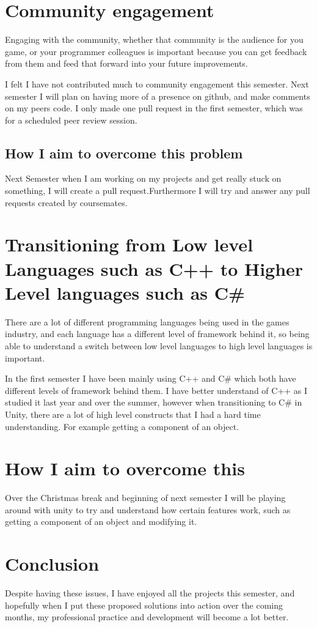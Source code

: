 \documentclass{scrartcl}
\begin{document}
\section{Community engagement}
Engaging with the community, whether that community is the audience for you game, or your programmer colleagues is important because you can get feedback from them and feed that forward into your future improvements.


I felt I have not contributed much to community engagement this semester.
Next semester I will plan on having more of a presence on github, and make comments on my peers code.
I only made one pull request in the first semester, which was for a scheduled peer review session.

\subsection{How I aim to overcome this problem}
Next Semester when I am working on my projects and get really stuck on something, I will create a pull request.Furthermore I will try and answer any pull requests created by coursemates.



\section{Transitioning from Low level Languages such as C++ to Higher Level languages such as C\#}
There are a lot of different programming languages being used in the games industry, and each language has a different level of framework behind it, so being able to understand a switch between low level languages to high level languages is important.

In the first semester I have been mainly using C++ and C\# which both have different levels of framework behind them. I have better understand of C++ as I studied it last year and over the summer, however when transitioning to C\# in Unity, there are a lot of high level constructs that I had a hard time understanding. For example getting a component of an object.

\section{How I aim to overcome this}
Over the Christmas break and beginning of next semester I will be playing around with unity to try and understand how certain features work, such as getting a component of an object and modifying it.

\section{Conclusion}
Despite having these issues, I have enjoyed all the projects this semester, and hopefully when I put these proposed solutions into action over the coming months, my professional practice and development will become a lot better.
\end{document}
